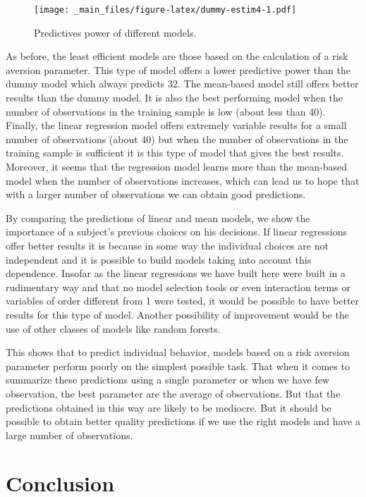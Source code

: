 \documentclass[
]{book}
\begin{document}
\begin{figure}
\centering
\texttt{[image: \_main\_files/figure-latex/dummy-estim4-1.pdf]}
\caption{\label{fig:dummy-estim4}Predictives power of different models.}
\end{figure}

As before, the least efficient models are those based on the calculation
of a risk aversion parameter. This type of model offers a lower
predictive power than the dummy model which always predicts 32. The
mean-based model still offers better results than the dummy model. It is
also the best performing model when the number of observations in the
training sample is low (about less than 40). Finally, the linear
regression model offers extremely variable results for a small number of
observations (about 40) but when the number of observations in the
training sample is sufficient it is this type of model that gives the
best results. Moreover, it seems that the regression model learns more
than the mean-based model when the number of observations increases,
which can lead us to hope that with a larger number of observations we
can obtain good predictions.

By comparing the predictions of linear and mean models, we show the
importance of a subject's previous choices on his decisions. If linear
regressions offer better results it is because in some way the
individual choices are not independent and it is possible to build
models taking into account this dependence. Insofar as the linear
regressions we have built here were built in a rudimentary way and that
no model selection tools or even interaction terms or variables of order
different from 1 were tested, it would be possible to have better
results for this type of model. Another possibility of improvement would
be the use of other classes of models like random forests.

This shows that to predict individual behavior, models based on a risk
aversion parameter perform poorly on the simplest possible task. That
when it comes to summarize these predictions using a single parameter or
when we have few observation, the best parameter are the
average of observations. But that the predictions obtained in this way
are likely to be mediocre. But it should be possible to obtain better
quality predictions if we use the right models and have a large number
of observations.

\hypertarget{discu4}{%
\section{Conclusion}\label{discu4}}
\end{document}
